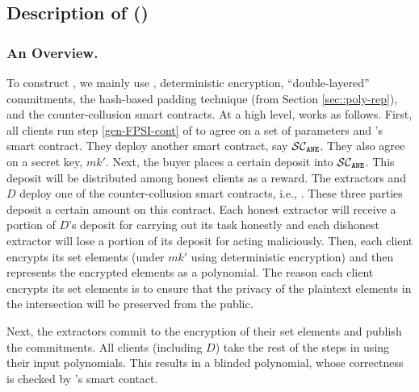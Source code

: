 

\vs
\vs

\subsection{Description of \withRew (\epsi)}

\vs

\subsubsection{An Overview.} To construct  \epsi, we mainly use \fpsi, deterministic encryption, ``double-layered'' commitments, the hash-based padding technique (from Section \ref{sec::poly-rep}), and the counter-collusion smart contracts. %
%
At a high level, \epsi works as follows. First, all clients run step \ref{gen-FPSI-cont} of \fpsi to agree on a set of parameters and \fpsi's smart contract.  They deploy another smart contract, say $\mathcal{SC}_{\mathtt{ANE}}$. They also agree on a secret key, $mk'$. Next, the buyer places a certain deposit into $\mathcal{SC}_{\mathtt{ANE}}$. This deposit will be distributed among honest clients as a reward. 
%
%
The extractors and $D$ deploy one of the counter-collusion smart contracts, i.e., \SCpc. These three parties deposit a certain amount on this contract.  Each honest extractor will receive a portion of $D$'s deposit for carrying out its task honestly and each dishonest extractor will lose a portion of its deposit for acting maliciously. 
%
Then, each client encrypts its set elements (under $mk'$ using deterministic encryption) and then represents the encrypted elements as a polynomial. The reason each client encrypts its set elements is to ensure that the privacy of the plaintext elements in the intersection will be preserved from the public. 








%
Next, the extractors commit to the encryption of their set elements and publish the commitments. 
%
All clients (including $D$) take the rest of the steps in \fpsi using their input polynomials. This results in a blinded polynomial,  whose correctness is checked by \fpsi's smart contact. 

